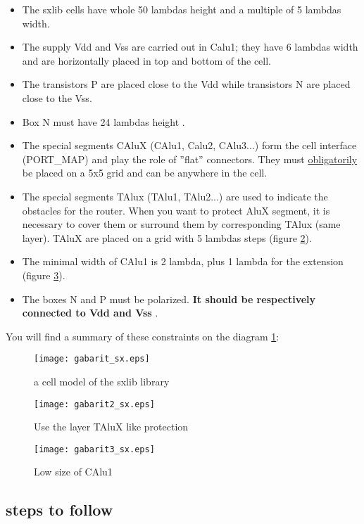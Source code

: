 \documentclass[12pt]{article}
\begin{document}
\begin{itemize}\itemsep=-.4ex
\item The sxlib cells have whole 50 lambdas height and a multiple of 5 lambdas width.
\item The supply Vdd and Vss are carried out in Calu1; they have 6 lambdas width and are 
horizontally placed in top and bottom of the cell.
\item The transistors P are placed close to the Vdd while transistors N are placed close
        to the Vss.
\item Box N must have 24 lambdas height .
\item The special segments CAluX (CAlu1, Calu2, CAlu3...) form the cell interface (PORT\_MAP) 
and play the role of ''flat'' connectors. They must {\underline{obligatorily}}
be placed on a 5x5 grid and can be anywhere in the cell.
\item The special segments TAlux (TAlu1, TAlu2...) are used to indicate the obstacles for the
        router. When you want to protect AluX segment, it is necessary to cover them
        or surround them by corresponding TAlux (same layer). TAluX are placed on a grid
        with 5 lambdas steps (figure \ref{Fig:gabarit2}).
\item The minimal width of CAlu1 is 2 lambda, plus 1 lambda for the extension (figure \ref{Fig:gabarit3}).
\item The boxes N and P must be polarized. { \bf It should be respectively connected to Vdd and Vss }.
\end{itemize}

You will find a summary of these constraints on the diagram 
\ref{Fig:gabarit}:

\begin{figure}[H]\centering
  \texttt{[image: gabarit\_sx.eps]}
  \caption{a cell model of the sxlib library }
  \label{Fig:gabarit}
\end{figure}

\begin{figure}[H]\centering
  \texttt{[image: gabarit2\_sx.eps]}
  \caption{Use the layer TAluX like protection}
  \label{Fig:gabarit2}
\end{figure}

\begin{figure}[H]\centering
  \texttt{[image: gabarit3\_sx.eps]}
  \caption{Low size of CAlu1}
  \label{Fig:gabarit3}
\end{figure}

\subsection{steps to follow}
\end{document}
